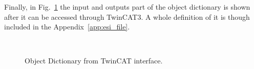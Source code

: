 Finally, in Fig.~\ref{fig:ecat_twincat_objects} the input and outputs part of the object dictionary is shown after it can be 
accessed through TwinCAT3. A whole definition of it is though included in the Appendix~\ref{app:esi_file}.

\begin{figure}[hb]
  \centering
  \\
  \caption{Object Dictionary from TwinCAT interface.} %
  \label{fig:ecat_twincat_objects}
\end{figure} 


